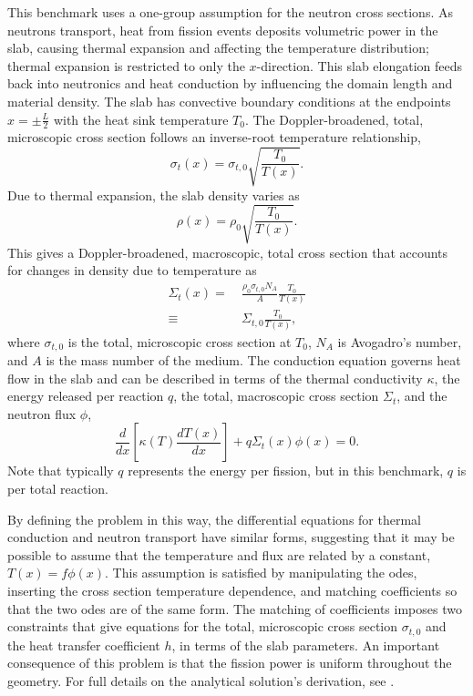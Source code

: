 \documentclass[letterpaper]{mc2023}
\begin{document}
This benchmark uses a one-group assumption for the neutron cross sections. As neutrons transport, heat from fission events deposits
volumetric power in the slab, causing thermal expansion and affecting the temperature distribution; thermal expansion is restricted
to only the $x$-direction. This slab elongation feeds back into neutronics and heat conduction by influencing the domain length and
material density. The slab has convective boundary conditions at the endpoints $x=\pm \frac{L}{2}$ with the heat sink temperature
$T_{0}$. The Doppler-broadened, total, microscopic cross section follows an inverse-root temperature relationship,
\begin{equation}
    \sigma_{t}(x) = \sigma_{t,0}\sqrt{\frac{T_{0}}{T(x)}}.
\end{equation}
Due to thermal expansion, the slab density varies as
\begin{equation} \label{sec:intro:density}
    \rho(x) =  \rho_{0} \sqrt{\frac{T_{0}}{T(x)}}.
\end{equation}
This gives a Doppler-broadened, macroscopic, total cross section that accounts for changes in density due to temperature as
\begin{equation}\begin{aligned} \label{sec:intro:doppler}
    \Sigma_{t}(x) =&\  \frac{\rho_{0}\sigma_{t,0} N_{A}}{A} \frac{T_{0}}{T(x)}\\
    \equiv&\  \Sigma_{t,0}\frac{T_{0}}{T(x)} ,
\end{aligned}\end{equation}
where $ \sigma_{t,0}$ is the total, microscopic cross section at $T_{0}$, $N_{A}$ is Avogadro's number, and $A$ is the mass number
of the medium. The conduction equation governs heat flow in the slab and can be described in terms of the thermal conductivity
$\kappa$, the energy released per reaction $q$, the total, macroscopic cross section $\Sigma_{t}$, and the neutron flux $\phi$,
\begin{equation}
     \frac{d}{dx}\left\lbrack\kappa(T)\frac{dT(x)}{dx}\right\rbrack + q \Sigma_{t}(x)\phi(x) = 0.
\end{equation}
Note that typically $q$ represents the energy per fission, but in this benchmark, $q$ is per total reaction. 

By defining the problem in this way, the differential equations for thermal conduction and neutron transport have similar forms,
suggesting that it may be possible to assume that the temperature and flux are related by a constant, $T(x)=f\phi(x)$. This
assumption is satisfied by manipulating the \glspl{ode}, inserting the cross section temperature dependence, and matching
coefficients so that the two \glspl{ode} are of the same form. The matching of coefficients imposes two constraints that give
equations for the total, microscopic cross section $\sigma_{t,0}$ and the heat transfer coefficient $h$, in terms of the slab
parameters. An important consequence of this problem is that the fission power is uniform throughout the geometry. For full
details on the analytical solution's derivation, see \cite{analytical-benchmark}.
\end{document}
